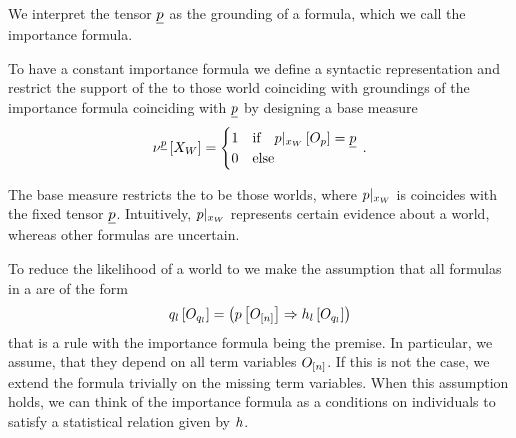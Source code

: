 We interpret the tensor $\underline{p}$ as the grounding of a formula, which we call the importance formula.

To have a constant importance formula we define a syntactic representation and restrict the support of the \HybridFOLNetwork{} to those world coinciding with groundings of the importance formula coinciding with $\underline{p}$ by designing a base measure
\begin{align*}
    \nu^{\underline{p}}\left[X_{W}\right]
    = \begin{cases}
          1 & \text{if}\quad {p}|_{x_{W}} \left[O_{p}\right] = \underline{p} \\
          0 & \text{else}
    \end{cases} \, .
\end{align*}

The base measure restricts the \HybridFOLNetwork{} to be those worlds, where ${p}|_{x_{W}}$ is coincides with the fixed tensor $\underline{p}$.
Intuitively, ${p}|_{x_{W}}$ represents certain evidence about a \firstOrderLogic{} world, whereas other formulas are uncertain.






To reduce the likelihood of a world to we make the assumption that all formulas in a \HybridFOLNetwork{} are of the form
\begin{align}
    \label{eq:folImplicationForm}
    q_{l}\left[O_{q_{l}}\right]
    = \left( p\left[O_{[n]}\right] \Rightarrow h_{l}\left[O_{q_{l}}\right] \right)
\end{align}
that is a rule with the importance formula being the premise.
In particular, we assume, that they depend on all term variables $O_{[n]}$.
If this is not the case, we extend the formula trivially on the missing term variables.
When this assumption holds, we can think of the importance formula as a conditions on individuals to satisfy a statistical relation given by $h$.

